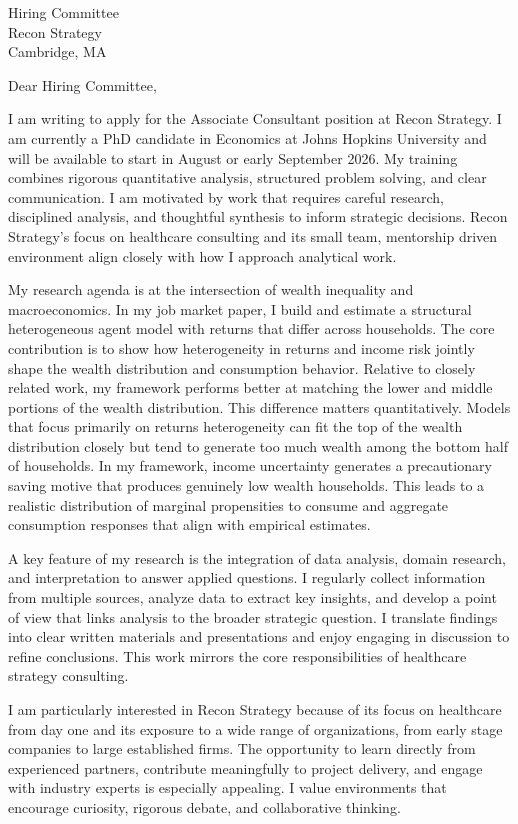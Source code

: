 \documentclass[11pt]{letter}
\begin{document}
\begin{letter}{Hiring Committee \\ Recon Strategy \\ Cambridge, MA}

\opening{Dear Hiring Committee,}

I am writing to apply for the Associate Consultant position at Recon Strategy. I am currently a PhD candidate in Economics at Johns Hopkins University and will be available to start in August or early September 2026. My training combines rigorous quantitative analysis, structured problem solving, and clear communication. I am motivated by work that requires careful research, disciplined analysis, and thoughtful synthesis to inform strategic decisions. Recon Strategy’s focus on healthcare consulting and its small team, mentorship driven environment align closely with how I approach analytical work.

My research agenda is at the intersection of wealth inequality and macroeconomics. In my job market paper, I build and estimate a structural heterogeneous agent model with returns that differ across households. The core contribution is to show how heterogeneity in returns and income risk jointly shape the wealth distribution and consumption behavior. Relative to closely related work, my framework performs better at matching the lower and middle portions of the wealth distribution. This difference matters quantitatively. Models that focus primarily on returns heterogeneity can fit the top of the wealth distribution closely but tend to generate too much wealth among the bottom half of households. In my framework, income uncertainty generates a precautionary saving motive that produces genuinely low wealth households. This leads to a realistic distribution of marginal propensities to consume and aggregate consumption responses that align with empirical estimates.

A key feature of my research is the integration of data analysis, domain research, and interpretation to answer applied questions. I regularly collect information from multiple sources, analyze data to extract key insights, and develop a point of view that links analysis to the broader strategic question. I translate findings into clear written materials and presentations and enjoy engaging in discussion to refine conclusions. This work mirrors the core responsibilities of healthcare strategy consulting.

I am particularly interested in Recon Strategy because of its focus on healthcare from day one and its exposure to a wide range of organizations, from early stage companies to large established firms. The opportunity to learn directly from experienced partners, contribute meaningfully to project delivery, and engage with industry experts is especially appealing. I value environments that encourage curiosity, rigorous debate, and collaborative thinking.


\end{letter}
\end{document}
